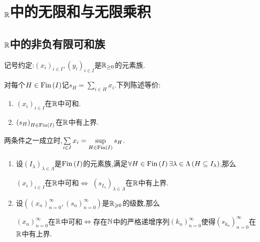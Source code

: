 \chapter{\texorpdfstring{$\mathbb{R}$}{R}中的无限和与无限乘积}

\section{\texorpdfstring{$\mathbb{R}$}{R}中的非负有限可和族}

记号约定:$\left(x_{i}\right)_{i\in I},\left(y_{i}\right)_{i\in I}$是$\mathbb{R}_{\geq 0}$的元素族.

\begin{theorem}{}{}
	对每个$H\in\operatorname{Fin}\left(I\right)$记$s_{H}=\sum\limits_{i\in H}x_{i}$.下列陈述等价:
	\begin{enumerate}
		\item $\left(x_{i}\right)_{i\in I}$在$\mathbb{R}$中可和.
		\item $\left(s_{H}\right)_{H\in\operatorname{Fin}\left(I\right)}$在$\mathbb{R}$中有上界.
	\end{enumerate}
	两条件之一成立时,$\sum\limits_{i\in I}x_{i}=\sup\limits_{H\in\operatorname{Fin}\left(I\right)}s_{H}$.
\end{theorem}

\begin{remark}{}{}
	\begin{enumerate}
		\item 设$\left(I_{\lambda}\right)_{\lambda\in\Lambda}$是$\operatorname{Fin}\left(I\right)$的元素族,满足$\forall H\in\operatorname{Fin}\left(I\right)\exists\lambda\in\Lambda\left(H\subseteq I_{\lambda}\right)$,那么
		\begin{center}
			$\left(x_{i}\right)_{i\in I}$在$\mathbb{R}$中可和$\iff$ $\left(s_{I_{\lambda}}\right)_{\lambda\in\Lambda}$在$\mathbb{R}$中有上界.
		\end{center}
		\item 设$\left(\left(x_{n}\right)_{n=0}^{\infty},\left(s_{n}\right)_{n=0}^{\infty}\right)$是$\mathbb{R}_{\geqslant 0}$的级数,那么
		\begin{center}	
			$\left(x_{n}\right)_{n=0}^{\infty}$在$\mathbb{R}$中可和$\iff$存在$\mathbb{N}$中的严格递增序列$\left(k_{n}\right)_{n=0}^{\infty}$使得$\left(s_{k_{n}}\right)_{n=0}^{\infty}$在$\mathbb{R}$中有上界.
		\end{center}
	\end{enumerate}
\end{remark}


